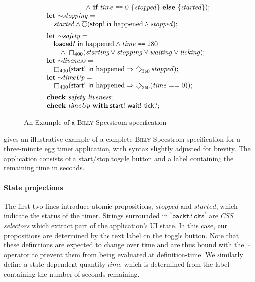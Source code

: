 \documentclass[sigplan,nonacm,10pt]{acmart}
\makeatletter
\newcommand{\Specstrom}[0]{%
  \if@ACM@anonymous%
  \textsc{Billy}%
  \else%
  Specstrom%
  \fi\xspace}
\newcommand{\WNext}{\operatorname{%
  \tikz[baseline]{
    \draw[line width=.12ex]
      (0,.6ex) circle (.8ex);
      \draw[line width=.12ex] (-0.8ex,1.6ex) -- (0.8ex,1.6ex);
  }}}{}
\newcommand{\Eventually}{\operatorname{%
  \tikz[baseline]{
    \draw[line width=.12ex,line join=round]
      (0ex,.6ex) -- (.95ex,1.55ex) -- (1.9ex,.6ex) -- (.95ex,-.35ex) -- cycle;
  }}}{}
\newcommand{\Always}{\operatorname{%
  \tikz[baseline]{
    \draw[draw=white] (-0.2ex,0ex) -- (1.7ex,0ex);
    \draw[line width=.12ex,line join=round]
      (0ex,-.2ex) -- (0ex,1.3ex) -- (1.5ex,1.3ex) -- (1.5ex,.-.2ex) -- cycle;
  }}}{}
\makeatother
\begin{document}
\begin{figure}
$$\begin{array}{l}
  \qquad\qquad\quad \quad\!\! \land\ \textbf{if}\ \mathit{time}\ \texttt{==}\ 0\ \{ \mathit{stopped} \}\ \textbf{else}\ \{ \mathit{started} \});\\
  \textbf{let} \sim\!\!\mathit{stopping} = \\\quad \mathit{started} \land \WNext (\mathsf{stop!}\ \mathsf{in}\ \mathrm{happened} \land \mathit{stopped});\\[0.5em]
  \textbf{let} \sim\!\!\mathit{safety} = \\
  \quad \mathsf{loaded?}\ \mathsf{in}\ \mathrm{happened} \land  \mathit{time}\ \texttt{==}\ 180
  \\\qquad \land\ \Always_{400} (\mathit{starting} \lor \mathit{stopping} \lor \mathit{waiting} \lor \mathit{ticking});\\
  \textbf{let} \sim\!\!\mathit{liveness} = \\\quad \Always_{400} (\mathsf{start!}\ \mathsf{in}\ \mathrm{happened} \Rightarrow \Eventually_{360} \mathit{stopped}); \\
  \textbf{let} \sim\!\!\mathit{timeUp} = \\\quad \Always_{400} (\mathsf{start!}\ \mathsf{in}\ \mathrm{happened} \Rightarrow \Eventually_{360}(\mathit{time}\ \mathtt{==}\ 0)); \\[0.5em]
  \textbf{check}\ \mathit{safety}\ \mathit{liveness};\\
  \textbf{check}\ \mathit{timeUp}\ \textbf{with}\ \mathsf{start!}\ \mathsf{wait!}\ \mathsf{tick?};
  \end{array}
  $$
  \caption{An Example of a \Specstrom specification}
  \label{fig:timer}
  \end{figure}

 gives an illustrative example of a complete \Specstrom specification for a three-minute egg timer application, with syntax slightly adjusted for brevity. The application consists of a start/stop toggle button and a label
containing the remaining time in seconds.

\paragraph{State projections} The first two lines introduce atomic propositions, $\mathit{stopped}$ and $\mathit{started}$, which indicate the status of the timer.
 Strings surrounded in ${}^\backprime\texttt{backticks}^\backprime$ are \emph{CSS selectors} which extract part of the application's UI state. In this case, our propositions
 are determined by the text label on the toggle button. Note that these definitions are expected to change over time and are thus bound with the $\sim$ operator to prevent them
 from being evaluated at definition-time. We similarly define a state-dependent quantity $\mathit{time}$ which is determined from the label containing the number of seconds remaining.
\end{document}
